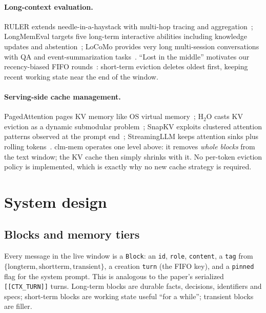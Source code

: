 \documentclass[10pt]{article}
\begin{document}
\paragraph{Long-context evaluation.} RULER extends needle-in-a-haystack with multi-hop tracing and aggregation~\cite{ruler}; LongMemEval targets five long-term interactive abilities including knowledge updates and abstention~\cite{longmemeval}; LoCoMo provides very long multi-session conversations with QA and event-summarization tasks~\cite{locomo}. ``Lost in the middle'' motivates our recency-biased FIFO rounds~\cite{lostmiddle}: short-term eviction deletes oldest first, keeping recent working state near the end of the window.

\paragraph{Serving-side cache management.} PagedAttention pages KV memory like OS virtual memory~\cite{paged}; H$_2$O casts KV eviction as a dynamic submodular problem~\cite{h2o}; SnapKV exploits clustered attention patterns observed at the prompt end~\cite{snapkv}; StreamingLLM keeps attention sinks plus rolling tokens~\cite{streamingllm}. clm-mem operates one level above: it removes \emph{whole blocks} from the text window; the KV cache then simply shrinks with it. No per-token eviction policy is implemented, which is exactly why no new cache strategy is required.

\section{System design}
\subsection{Blocks and memory tiers}
Every message in the live window is a \texttt{Block}: an \texttt{id}, \texttt{role}, \texttt{content}, a \texttt{tag} from $\{\text{longterm}, \text{shortterm}, \text{transient}\}$, a creation \texttt{turn} (the FIFO key), and a \texttt{pinned} flag for the system prompt. This is analogous to the paper's serialized \verb|[[CTX_TURN]]| turns. Long-term blocks are durable facts, decisions, identifiers and specs; short-term blocks are working state useful ``for a while''; transient blocks are filler.
\end{document}
